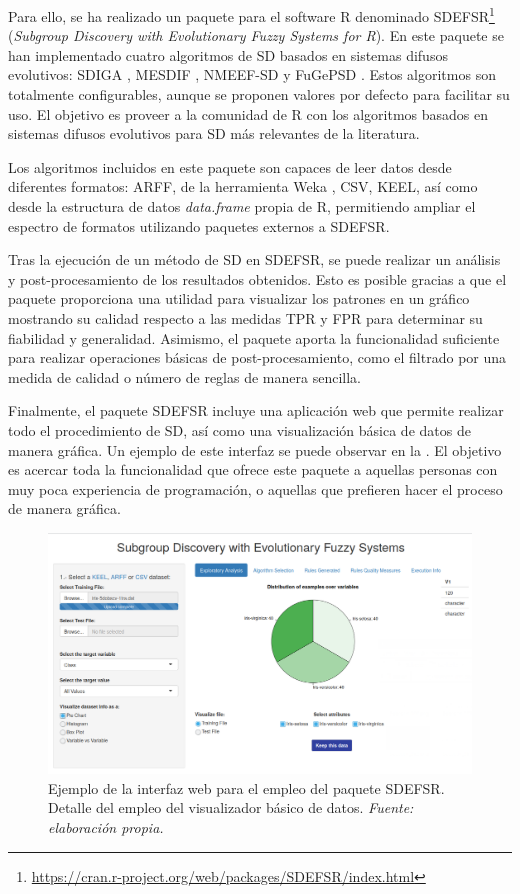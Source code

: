 \documentclass[c5paper,10pt,twoside]{book}	   	%
\begin{document}
Para ello, se ha realizado un paquete para el software R denominado SDEFSR\footnote{\url{https://cran.r-project.org/web/packages/SDEFSR/index.html}} (\textit{Subgroup Discovery with Evolutionary Fuzzy Systems for R}). En este paquete se han implementado cuatro algoritmos de \ac{SD} basados en sistemas difusos evolutivos: SDIGA \cite{Dghm07}, MESDIF \cite{Dgh07}, NMEEF-SD \cite{Cgdh10} y FuGePSD \cite{Crdwgge15}. Estos algoritmos son totalmente configurables, aunque se proponen valores por defecto para facilitar su uso. El objetivo es proveer a la comunidad de R con los algoritmos basados en sistemas difusos evolutivos para \ac{SD} más relevantes de la literatura. 

Los algoritmos incluidos en este paquete son capaces de leer datos desde diferentes formatos: ARFF, de la herramienta Weka \cite{Weka2009}, CSV, KEEL, así como desde la estructura de datos \textit{data.frame} propia de R, permitiendo ampliar el espectro de formatos utilizando paquetes externos a SDEFSR.

Tras la ejecución de un método de \ac{SD} en SDEFSR, se puede realizar un análisis y post-procesamiento de los resultados obtenidos. Esto es posible gracias a que el paquete proporciona una utilidad para visualizar los patrones en un gráfico mostrando su calidad respecto a las medidas \ac{TPR} y \ac{FPR} para determinar su fiabilidad y generalidad. Asimismo, el paquete aporta la funcionalidad suficiente para realizar operaciones básicas de post-procesamiento, como el filtrado por una medida de calidad o número de reglas de manera sencilla.




Finalmente, el paquete SDEFSR incluye una aplicación web que permite realizar todo el procedimiento de \ac{SD}, así como una visualización básica de datos de manera gráfica. Un ejemplo de este interfaz se puede observar en la . El objetivo es acercar toda la funcionalidad que ofrece este paquete a aquellas personas con muy poca experiencia de programación, o aquellas que prefieren hacer el proceso de manera gráfica. 

\begin{figure}[!hbtp]
	\centering
	\includegraphics[width=0.8\linewidth]{./Figures/SDEFSR_GUI.png}
	\caption[Ejemplo de la interfaz web para el empleo del paquete SDEFSR]{Ejemplo de la interfaz web para el empleo del paquete SDEFSR. Detalle del empleo del visualizador básico de datos. \textit{Fuente: elaboración propia.}}
	\label{fig:webSDR}
\end{figure}
\end{document}
